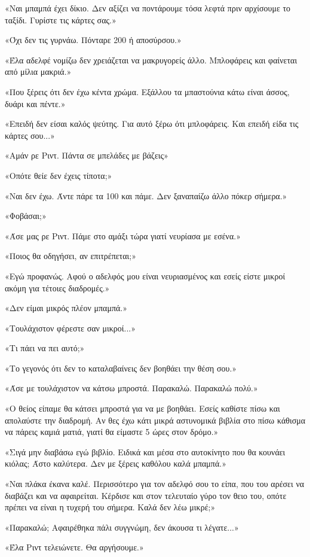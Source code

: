 \documentclass[12pt,twoside, openany]{book}
\begin{document}
«Ναι μπαμπά έχει δίκιο. Δεν αξίζει να ποντάρουμε τόσα λεφτά πριν αρχίσουμε το ταξίδι. Γυρίστε τις κάρτες σας.»

«Όχι δεν τις γυρνάω. Πόνταρε 200 ή αποσύρσου.»

«Έλα αδελφέ νομίζω δεν χρειάζεται να μακρυγορείς άλλο. Μπλοφάρεις και φαίνεται από μίλια μακριά.»

«Που ξέρεις ότι δεν έχω κέντα χρώμα. Εξάλλου τα μπαστούνια κάτω είναι άσσος, δυάρι και πέντε.»

«Επειδή δεν είσαι καλός ψεύτης. Για αυτό ξέρω ότι μπλοφάρεις. Και επειδή είδα τις κάρτες σου...»

«Αμάν ρε Ριντ. Πάντα σε μπελάδες με βάζεις»

«Οπότε θείε δεν έχεις τίποτα;»

«Ναι δεν έχω. Άντε πάρε τα 100 και πάμε. Δεν ξαναπαίζω άλλο πόκερ σήμερα.»

«Φοβάσαι;»

«Άσε μας ρε Ριντ. Πάμε στο αμάξι τώρα γιατί νευρίασα με εσένα.»

«Ποιος θα οδηγήσει, αν επιτρέπεται;»

«Εγώ προφανώς. Αφού ο αδελφός μου είναι νευριασμένος και εσείς είστε μικροί ακόμη για τέτοιες διαδρομές.»

«Δεν είμαι μικρός πλέον μπαμπά.»

«Τουλάχιστον φέρεστε σαν μικροί...»

«Τι πάει να πει αυτό;»

«Το γεγονός ότι δεν το καταλαβαίνεις δεν βοηθάει την θέση σου.»

«Άσε με τουλάχιστον να κάτσω μπροστά. Παρακαλώ. Παρακαλώ πολύ.»

«Ο θείος είπαμε θα κάτσει μπροστά για να με βοηθάει. Εσείς καθίστε πίσω και απολαύστε την διαδρομή. Αν θες έχω κάτι μικρά αστυνομικά βιβλία στο πίσω κάθισμα να πάρεις καμιά ματιά, γιατί θα είμαστε 5 ώρες στον δρόμο.»

«Σιγά μην διαβάσω εγώ βιβλίο. Ειδικά και μέσα στο αυτοκίνητο που θα κουνάει κιόλας; Άστο καλύτερα. Δεν με ξέρεις καθόλου καλά μπαμπά.»

«Ναι πλάκα έκανα καλέ. Περισσότερο για τον αδελφό σου το είπα, που του αρέσει να διαβάζει και να αφαιρείται. Κέρδισε και στον τελευταίο γύρο τον θειο του, οπότε πρέπει να είναι η τυχερή του σήμερα. Καλά δεν λέω μικρέ;»

«Παρακαλώ; Αφαιρέθηκα πάλι συγγνώμη, δεν άκουσα τι λέγατε...»

«Έλα Ριντ τελειώνετε. Θα αργήσουμε.»
\end{document}
